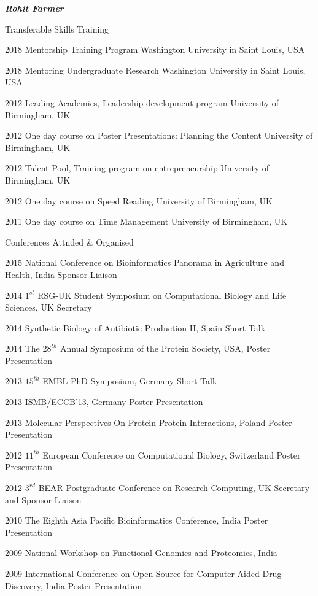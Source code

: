 \documentclass[10pt]{article}
\begin{document}
\begin{cv}{\huge \it \bfseries Rohit Farmer}
\vskip3pt
\begin{cvlist}{Transferable Skills Training}
	\item[2018] Mentorship Training Program \hfill Washington University in Saint Louis, USA
	\item[2018] Mentoring Undergraduate Research \hfill Washington University in Saint Louis, USA
	\item[2012] Leading Academics, Leadership development program \hfill University of Birmingham, UK
	\item[2012] One day course on Poster Presentations: Planning the Content \hfill University of Birmingham, UK
	\item[2012] Talent Pool, Training program on entrepreneurship \hfill University of Birmingham, UK
	\item[2012] One day course on Speed Reading \hfill University of Birmingham, UK
	\item[2011] One day course on Time Management \hfill University of Birmingham, UK
\end{cvlist}

\vskip3pt
\begin{cvlist}{Conferences Attnded \& Organised}
	\item[2015] National Conference on Bioinformatics Panorama in Agriculture and Health, India \hfill Sponsor Liaison
	\item[2014] $1^{st}$ RSG-UK Student Symposium on Computational Biology and Life Sciences, UK \hfill Secretary
	\item[2014] Synthetic Biology of Antibiotic Production II, Spain \hfill Short Talk
	\item[2014] The $28^{th}$ Annual Symposium of the Protein Society, USA, \hfill Poster Presentation
	\item[2013] $15^{th}$ EMBL PhD Symposium, Germany \hfill Short Talk
	\item[2013] ISMB/ECCB'13, Germany \hfill Poster Presentation
	\item[2013] Molecular Perspectives On Protein-Protein Interactions, Poland \hfill Poster Presentation
	\item[2012] $11^{th}$ European Conference on Computational Biology, Switzerland \hfill Poster Presentation
	\item[2012] $3^{rd}$ BEAR Postgraduate Conference on Research Computing, UK \hfill Secretary and Sponsor Liaison
	\item[2010] The Eighth Asia Pacific Bioinformatics Conference, India \hfill Poster Presentation
	\item[2009] National Workshop on Functional Genomics and Proteomics, India
	\item[2009] International Conference on Open Source for Computer Aided Drug Discovery, India \hfill Poster Presentation
\end{cvlist}


\end{cv}
\end{document}
